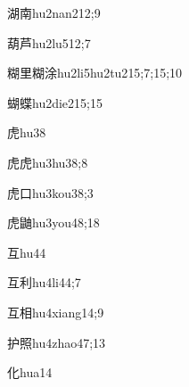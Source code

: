 \begin{verbete}{湖南}{hu2nan2}{12;9}
\end{verbete}

\begin{verbete}{葫芦}{hu2lu5}{12;7}
\end{verbete}

\begin{verbete}{糊里糊涂}{hu2li5hu2tu2}{15;7;15;10}
\end{verbete}

\begin{verbete}{蝴蝶}{hu2die2}{15;15}
\end{verbete}

\begin{verbete}{虎}{hu3}{8}
\end{verbete}

\begin{verbete}{虎虎}{hu3hu3}{8;8}
\end{verbete}

\begin{verbete}{虎口}{hu3kou3}{8;3}
\end{verbete}

\begin{verbete}{虎鼬}{hu3you4}{8;18}
\end{verbete}

\begin{verbete}{互}{hu4}{4}
\end{verbete}

\begin{verbete}{互利}{hu4li4}{4;7}
\end{verbete}

\begin{verbete}{互相}{hu4xiang1}{4;9}
\end{verbete}

\begin{verbete}{护照}{hu4zhao4}{7;13}
\end{verbete}

\begin{verbete}{化}{hua1}{4}
\end{verbete}

